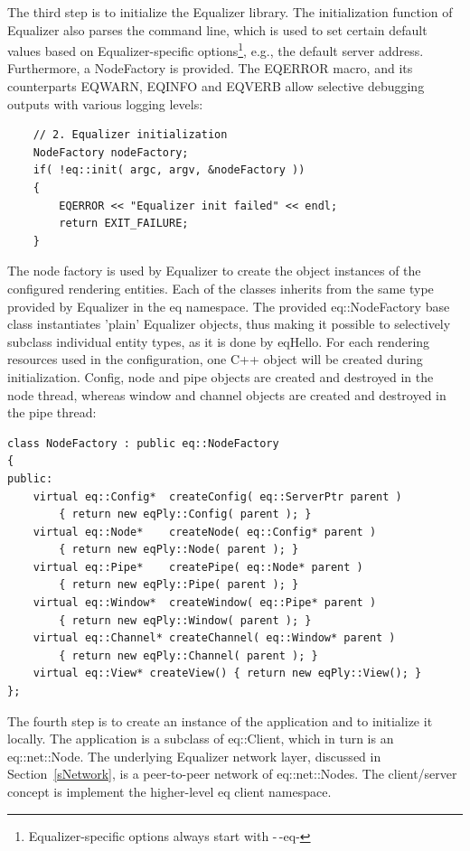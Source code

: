 \documentclass[10pt,a4]{scrartcl}
\newcommand{\sref}[1]{Section~\ref{#1}}
\begin{document}
The third step is to initialize the Equalizer library. The
initialization function of Equalizer also parses the command line, which
is used to set certain default values based on Equalizer-specific
options\footnote{Equalizer-specific options always start with -\,-eq-},
e.g., the default server address. Furthermore, a \textsf{NodeFactory} is
provided. The \textsf{EQERROR} macro, and its counterparts
\textsf{EQWARN}, \textsf{EQINFO} and \textsf{EQVERB} allow selective
debugging outputs with various logging levels:

{\footnotesize\begin{lstlisting}
    // 2. Equalizer initialization
    NodeFactory nodeFactory;
    if( !eq::init( argc, argv, &nodeFactory ))
    {
        EQERROR << "Equalizer init failed" << endl;
        return EXIT_FAILURE;
    }
\end{lstlisting}}%

The node factory is used by Equalizer to create the object instances of
the configured rendering entities. Each of the classes inherits from the
same type provided by Equalizer in the \textsf{eq} namespace. The
provided \textsf{eq::NodeFactory} base class instantiates 'plain'
Equalizer objects, thus making it possible to selectively subclass
individual entity types, as it is done by \textsf{eqHello}. For each
rendering resources used in the configuration, one C++ object will be
created during initialization. Config, node and pipe objects are created and
destroyed in the node thread, whereas window and channel objects are
created and destroyed in the pipe thread:

{\footnotesize\begin{lstlisting}
class NodeFactory : public eq::NodeFactory
{
public:
    virtual eq::Config*  createConfig( eq::ServerPtr parent )
        { return new eqPly::Config( parent ); }
    virtual eq::Node*    createNode( eq::Config* parent )  
        { return new eqPly::Node( parent ); }
    virtual eq::Pipe*    createPipe( eq::Node* parent )
        { return new eqPly::Pipe( parent ); }
    virtual eq::Window*  createWindow( eq::Pipe* parent )
        { return new eqPly::Window( parent ); }
    virtual eq::Channel* createChannel( eq::Window* parent )
        { return new eqPly::Channel( parent ); }
    virtual eq::View* createView() { return new eqPly::View(); }
};
\end{lstlisting}}

The fourth step is to create an instance of the application and to
initialize it locally. The application is a subclass of
\textsf{eq::Client}, which in turn is an \textsf{eq::net::Node}. The
underlying Equalizer network layer, discussed in \sref{sNetwork}, is a
peer-to-peer network of \textsf{eq::net::Node}s. The client/server
concept is implement the higher-level \textsf{eq} client namespace.
\end{document}
